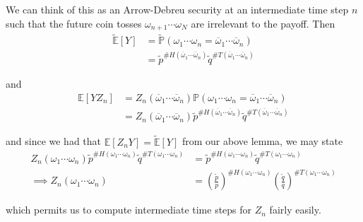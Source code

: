 \documentclass[12pt]{article}
\newlength\tindent
\renewcommand{\indent}{\hspace*{\tindent}}
\renewcommand{\P}{\mathbb P}
\newcommand{\E}{\mathbb E}
\begin{document}
\indent We can think of this as an Arrow-Debreu security at an intermediate time step $n$ such that the future coin tosses $\omega_{n + 1}\cdots\omega_N$ are irrelevant to the payoff. Then
\begin{align*}
	\tilde{\E}[Y] &= \tilde{\P}( \omega_1\cdots\omega_n = \overline{\omega}_1\cdots\overline{\omega}_n ) \\
	&= \tilde{p}^{\#H(\overline{\omega}_1\cdots\overline{\omega}_n)} \tilde{q}^{\#T(\overline{\omega}_1\cdots\overline{\omega}_n)} 
\end{align*}

and
\begin{align*}
	\E[YZ_n] &= Z_n(\overline{\omega}_1\cdots\overline{\omega}_n) \P( \omega_1\cdots\omega_n = \overline{\omega}_1\cdots\overline{\omega}_n )\\
	&= Z_n(\overline{\omega}_1\cdots\overline{\omega}_n)\tilde{p}^{\#H(\overline{\omega}_1\cdots\overline{\omega}_n)} \tilde{q}^{\#T(\overline{\omega}_1\cdots\overline{\omega}_n)} 
\end{align*}

and since we had that $\E[Z_nY] = \tilde{\E}[Y]$ from our above lemma, we may state
\begin{align*}
	Z_n(\omega_1\cdots\omega_n)\tilde{p}^{\#H(\omega_1\cdots\omega_n)} \tilde{q}^{\#T(\omega_1\cdots\omega_n)} &= \tilde{p}^{\#H(\omega_1\cdots\omega_n)} \tilde{q}^{\#T(\omega_1\cdots\omega_n)} \\
	\implies Z_n(\omega_1\cdots\omega_n) &= \left( \frac{\tilde{p}}{p} \right)^{\#H(\omega_1\cdots\omega_n)} \left( \frac{\tilde{q}}{q} \right)^{\#T(\omega_1\cdots\omega_n)} 
\end{align*}

which permits us to compute intermediate time steps for $Z_n$ fairly easily.
\end{document}
